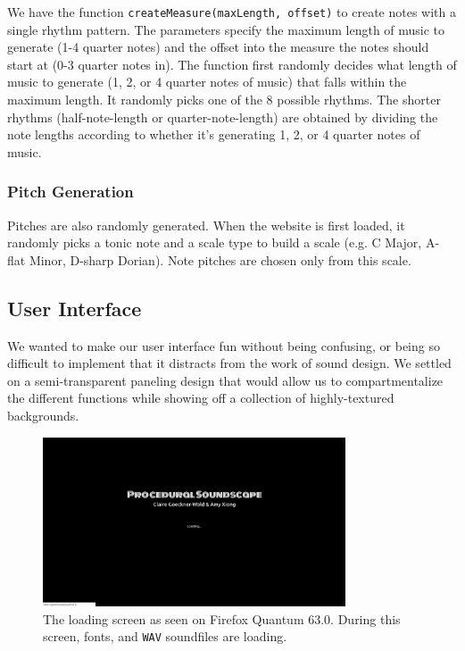 \documentclass[12pt,a4paper]{article}
\newcommand{\code}{\texttt}
\newcommand{\lightcode}[1]{\colorbox{light-gray}{\texttt{#1}}}
\begin{document}
We have the function \lightcode{createMeasure(maxLength, offset)} to create notes with a single rhythm pattern. The parameters specify the maximum length of music to generate (1-4 quarter notes) and the offset into the measure the notes should start at (0-3 quarter notes in). The function first randomly decides what length of music to generate (1, 2, or 4 quarter notes of music) that falls within the maximum length. It randomly picks one of the 8 possible rhythms. The shorter rhythms (half-note-length or quarter-note-length) are obtained by dividing the note lengths according to whether it's generating 1, 2, or 4 quarter notes of music.

\subsubsection{Pitch Generation}

Pitches are also randomly generated. When the website is first loaded, it randomly picks a tonic note and a scale type to build a scale (e.g. C Major, A-flat Minor, D-sharp Dorian). Note pitches are chosen only from this scale.

\subsection{User Interface}
We wanted to make our user interface fun without being confusing, or being so difficult to implement that it distracts from the work of sound design. We settled on a semi-transparent paneling design that would allow us to compartmentalize the different functions while showing off a collection of highly-textured backgrounds.

\begin{figure}
\centering\includegraphics[width=0.8\textwidth]{images/loading.png}
\caption{The loading screen as seen on Firefox Quantum 63.0. During this screen, fonts, and \code{WAV} soundfiles are loading.}
\end{figure}
\end{document}
